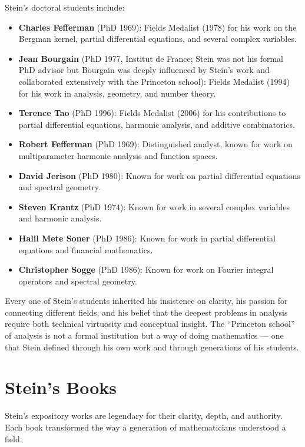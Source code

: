 Stein's doctoral students include:
\begin{itemize}
    \item \textbf{Charles Fefferman} (PhD 1969): Fields Medalist (1978) for his work on the Bergman kernel, partial differential equations, and several complex variables.
    \item \textbf{Jean Bourgain} (PhD 1977, Institut de France; Stein was not his formal PhD advisor but Bourgain was deeply influenced by Stein's work and collaborated extensively with the Princeton school): Fields Medalist (1994) for his work in analysis, geometry, and number theory.
    \item \textbf{Terence Tao} (PhD 1996): Fields Medalist (2006) for his contributions to partial differential equations, harmonic analysis, and additive combinatorics.
    \item \textbf{Robert Fefferman} (PhD 1969): Distinguished analyst, known for work on multiparameter harmonic analysis and function spaces.
    \item \textbf{David Jerison} (PhD 1980): Known for work on partial differential equations and spectral geometry.
    \item \textbf{Steven Krantz} (PhD 1974): Known for work in several complex variables and harmonic analysis.
    \item \textbf{Halil Mete Soner} (PhD 1986): Known for work in partial differential equations and financial mathematics.
    \item \textbf{Christopher Sogge} (PhD 1986): Known for work on Fourier integral operators and spectral geometry.
\end{itemize}

Every one of Stein's students inherited his insistence on clarity, his passion for connecting different fields, and his belief that the deepest problems in analysis require both technical virtuosity and conceptual insight. The ``Princeton school'' of analysis is not a formal institution but a way of doing mathematics --- one that Stein defined through his own work and through generations of his students.

\section{Stein's Books}

Stein's expository works are legendary for their clarity, depth, and authority. Each book transformed the way a generation of mathematicians understood a field.

